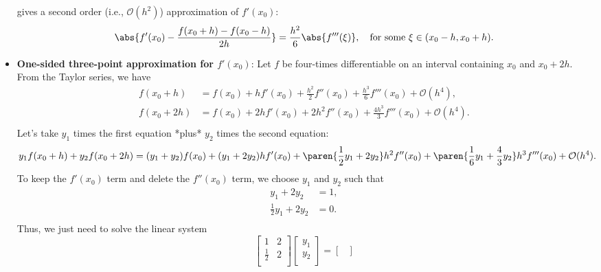 \documentclass{report}
\begin{document}
\begin{itemize}
            gives a second order (i.e., $\mathcal{O}(h^2)$) approximation of $f'(x_0)$:
            $$\abs{f'(x_0) -  \frac{f(x_0 + h) - f(x_0 - h)}{2h}} = \frac{h^2}{6}\abs{f'''(\xi)}, \quad \text{for some $\xi \in (x_0-h,x_0+h).$}$$
        \item \textbf{ One-sided three-point approximation for $f'(x_0)$}:
            Let $f$ be four-times differentiable on an interval containing $x_0$ and $x_0 + 2h$. From the Taylor series, we have
            \begin{align*}
                f(x_0 + h) &= f(x_0) + hf'(x_0) + \frac{h^2}{2}f''(x_0) + \frac{h^3}{6}f'''(x_0) + \mathcal{O}(h^4), \\
                f(x_0 + 2h) &= f(x_0) + 2hf'(x_0) + 2h^2f''(x_0) + \frac{4h^3}{3}f'''(x_0) + \mathcal{O}(h^4). \\
            \end{align*}
            \bigbreak \noindent 
            Let's take $y_1$ times the first equation *plus* $y_2$ times the second equation:
            $$
            y_1 f(x_0 + h) + y_2 f(x_0 + 2h) = \\ 
            (y_1 + y_2) f(x_0)  \\
            + (y_1 + 2y_2)hf'(x_0) \\
            +\paren{\frac{1}{2}y_1 + 2y_2} h^2f''(x_0) \\
            +\paren{\frac{1}{6}y_1 + \frac{4}{3} y_2} h^3f'''(x_0) +\mathcal{O}(h^4).
            $$
            \bigbreak \noindent 
            To keep the $f'(x_0)$ term and delete the $f''(x_0)$ term, we choose $y_1$ and $y_2$ such that
            \begin{align*}
                y_1 + 2 y_2 &= 1, \\
                \frac{1}{2} y_1 + 2y_2 &= 0.\\
            \end{align*}
            Thus, we just need to solve the linear system
            $$
            \begin{bmatrix}
                1 & 2 \\
                \frac{1}{2} & 2 \\
            \end{bmatrix}
            \begin{bmatrix}
                y_1 \\
                y_2 \\
            \end{bmatrix}
            =
            \begin{bmatrix}

\end{bmatrix}$$
\end{itemize}
\end{document}

